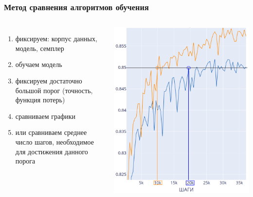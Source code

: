 \documentclass{beamer}
\begin{document}
\begin{frame}
	\frametitle{Метод сравнения алгоритмов обучения}
	\begin{columns}
		\begin{enumerate}
			\item фиксируем: корпус данных, модель, семплер
			\item обучаем модель
			\item фиксируем достаточно большой порог (точность, функция потерь)
			\item сравниваем графики
			\item или сравниваем среднее число шагов, необходимое для достижения данного порога
		\end{enumerate}
		\includegraphics[scale=0.25]{compare}
	\end{columns}
\end{frame}
\end{document}
